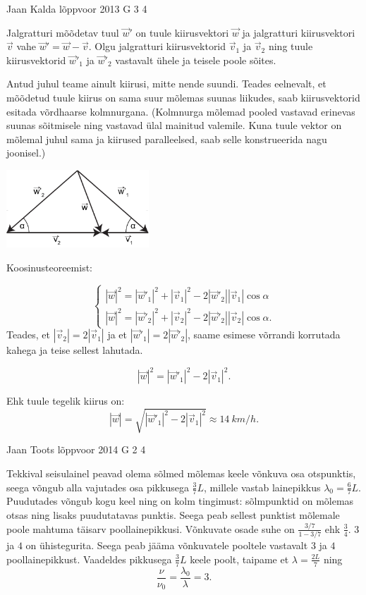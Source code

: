 \documentclass[11pt]{article}
\begin{document}
{%
{Jaan Kalda} %
{lõppvoor} %
{2013} %
{G 3} %
{4} %
{

\ifSolution
Jalgratturi mõõdetav tuul $\vec w'$ on tuule kiirusvektori $\vec w$ ja jalgratturi kiirusvektori $\vec v$ vahe $\vec w'=\vec w - \vec v$. Olgu jalgratturi kiirusvektorid $\vec v_1$ ja $\vec v_2$ ning tuule kiirusvektorid $\vec w'_1$ ja $\vec w'_2$ vastavalt ühele ja teisele poole sõites.

Antud juhul teame ainult kiirusi, mitte nende suundi. Teades eelnevalt, et mõõdetud tuule kiirus on sama suur mõlemas suunas liikudes, saab kiirusvektorid esitada võrdhaarse kolmnurgana. (Kolmnurga mõlemad pooled vastavad erinevas suunas sõitmisele ning vastavad ülal mainitud valemile. Kuna tuule vektor on mõlemal juhul sama ja kiirused paralleelsed, saab selle konstrueerida nagu joonisel.)

\begin{center}
\includegraphics[width=0.4\textwidth]{2013-v3g-03-jalgrattur}\\
\end{center}

Koosinusteoreemist: 

$$
\begin{cases}
|\vec w|^2 = |\vec w'_1|^2 + |\vec v_1|^2 - 2 |\vec w'_2| |\vec v_1|\cos \alpha \\
|\vec w|^2 = |\vec w'_2|^2 + |\vec v_2|^2 - 2 |\vec w'_2| |\vec v_2|\cos \alpha.
\end{cases}
$$
Teades, et $ |\vec v_2|=2 |\vec v_1|$ ja et $ |\vec w'_1|=2 |\vec w'_2|$, saame esimese võrrandi korrutada kahega ja teise sellest lahutada.

$$|\vec w|^2 = |\vec w'_1|^2 - 2|\vec v_1|^2. $$

Ehk tuule tegelik kiirus on:
$$|\vec w|=\sqrt{|\vec w'_1|^2-2|\vec v_1|^2} \approx \SI{14}{km \per h}.$$
\fi
}

{Jaan Toots} %
{lõppvoor} %
{2014} %
{G 2} %
{4} %
{

\ifSolution
Tekkival seisulainel peavad olema sõlmed mõlemas keele võnkuva osa otspunktis, seega võngub alla vajutades osa pikkusega $\frac{3}{7}L$, millele vastab lainepikkus $\lambda_0=\frac{6}{7}L$. Puudutades võngub kogu keel ning on kolm tingimust: sõlmpunktid on mõlemas otsas ning lisaks puudutatavas punktis. Seega peab sellest punktist mõlemale poole mahtuma täisarv poollainepikkusi. Võnkuvate osade suhe on $\frac{3/7}{1-3/7}$ ehk $\frac{3}{4}$. $3$ ja $4$ on ühistegurita. Seega peab jääma võnkuvatele pooltele vastavalt $3$ ja $4$ poollainepikkust. Vaadeldes pikkusega $\frac{3}{7}L$ keele poolt, taipame et $\lambda=\frac{2L}{7}$ ning
\[
\frac{\nu}{\nu_0}=\frac{\lambda_0}{\lambda}=3.
\]
\fi
}

}
\end{document}

